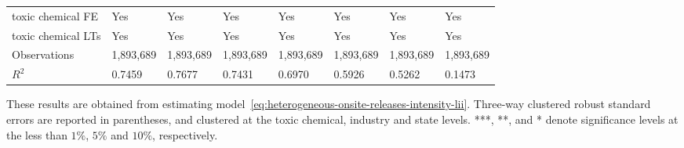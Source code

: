\begin{table}[H]
{\begin{tabular}{@{}llllllll@{}}
            toxic chemical FE                     & Yes       & Yes           & Yes       & Yes          & Yes             & Yes           & Yes                 \\
            toxic chemical LTs                    & Yes       & Yes           & Yes       & Yes          & Yes             & Yes           & Yes                 \\ \midrule \midrule
            Observations                          & 1,893,689 & 1,893,689     & 1,893,689 & 1,893,689    & 1,893,689       & 1,893,689     & 1,893,689           \\
            $R^2$                                 & 0.7459    & 0.7677        & 0.7431    & 0.6970       & 0.5926          & 0.5262        & 0.1473              \\ \bottomrule \bottomrule
        \end{tabular}%
    }
    \begin{minipage}{18cm}
        \vspace{0.05in}
        These results are obtained from estimating model~\ref{eq:heterogeneous-onsite-releases-intensity-lii}. Three-way clustered robust standard errors are reported in parentheses, and clustered at the toxic chemical, industry and state levels. ***, **, and * denote significance levels at the less than $1\%$, $5\%$ and $10\%$, respectively.
    \end{minipage}
\end{table}